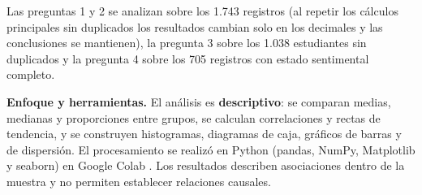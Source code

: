 Las preguntas 1 y 2 se analizan sobre los 1.743 registros (al repetir los cálculos principales sin
duplicados los resultados cambian solo en los decimales y las conclusiones se mantienen), la pregunta 3
sobre los 1.038 estudiantes sin duplicados y la pregunta 4 sobre los 705 registros con estado sentimental
completo.

\textbf{Enfoque y herramientas.} El análisis es \textbf{descriptivo}: se comparan medias, medianas y
proporciones entre grupos, se calculan correlaciones y rectas de tendencia, y se construyen histogramas,
diagramas de caja, gráficos de barras y de dispersión. El procesamiento se realizó en Python (pandas,
NumPy, Matplotlib y seaborn) en Google Colab \cite{mckinney}. Los resultados describen asociaciones dentro
de la muestra y no permiten establecer relaciones causales.
